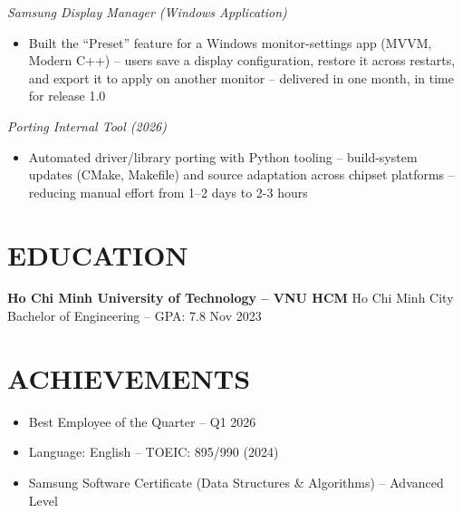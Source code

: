 \documentclass[a4paper,10pt]{article}
\newcommand{\project}[1]{\vspace{2pt}\textit{#1}\vspace{1pt}}
\begin{document}
\project{Samsung Display Manager (Windows Application)}
\begin{itemize}
    \item Built the ``Preset'' feature for a Windows monitor-settings app (MVVM, Modern C++) -- users
        save a display configuration, restore it across restarts, and export it to apply on another
        monitor -- delivered in one month, in time for release 1.0
\end{itemize}

\project{Porting Internal Tool (2026)}
\begin{itemize}
    \item Automated driver/library porting with Python tooling -- build-system updates
          (CMake, Makefile) and source adaptation across chipset platforms --
          reducing manual effort from 1--2 days to 2-3 hours
\end{itemize}

\section*{EDUCATION}
\textbf{Ho Chi Minh University of Technology -- VNU HCM} \hfill Ho Chi Minh City \\
Bachelor of Engineering -- GPA: 7.8 \hfill Nov 2023

\section*{ACHIEVEMENTS}
\begin{itemize}
    \item Best Employee of the Quarter -- Q1 2026
    \item Language: English -- TOEIC: 895/990 (2024)
    \item Samsung Software Certificate (Data Structures \& Algorithms) -- Advanced Level
\end{itemize}
\end{document}
